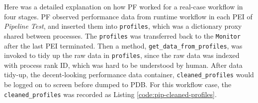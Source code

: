 \documentclass[10pt,twoside,openright,logo]{report}
\begin{document}
Here was a detailed explanation on how PF worked for a real-case workflow in four stages.
PF observed performance data from runtime workflow in each PEI of \textit{Pipeline Test}, and inserted them into \texttt{profiles}, which was a dictionary proxy shared between processes. The \texttt{profiles} was transferred back to the \texttt{Monitor} after the last PEI terminated. Then a method, \texttt{get_data_from_profiles}, was invoked to tidy up the raw data in \texttt{profiles}, since the raw data was indexed with process rank ID, which was hard to be understood by human. After data tidy-up, the decent-looking performance data container, \texttt{cleaned_profiles} would be logged on to screen before dumped to PDB. For this workflow case, the \texttt{cleaned_profiles} was recorded as Listing \ref{code:pip-cleaned-profiles}.
\end{document}
